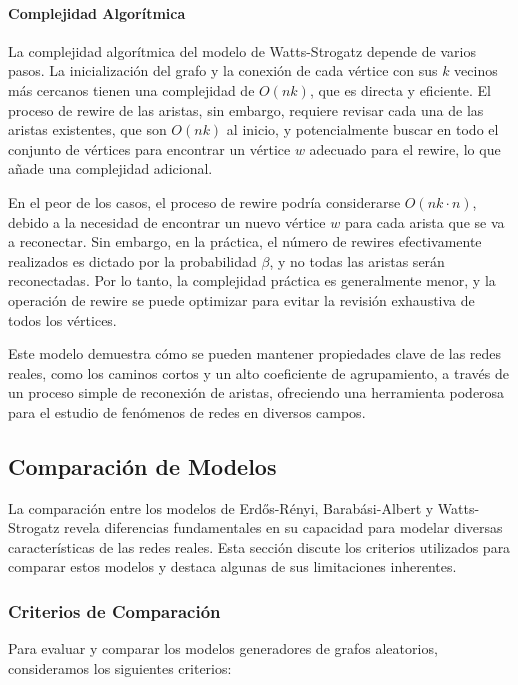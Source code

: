 \documentclass[12pt]{book}
\begin{document}
\paragraph{Complejidad Algorítmica}

La complejidad algorítmica del modelo de Watts-Strogatz depende de varios pasos. La inicialización del grafo y la conexión de cada vértice con sus $k$ vecinos más cercanos tienen una complejidad de $O(nk)$, que es directa y eficiente. El proceso de rewire de las aristas, sin embargo, requiere revisar cada una de las aristas existentes, que son $O(nk)$ al inicio, y potencialmente buscar en todo el conjunto de vértices para encontrar un vértice $w$ adecuado para el rewire, lo que añade una complejidad adicional.

En el peor de los casos, el proceso de rewire podría considerarse $O(nk \cdot n)$, debido a la necesidad de encontrar un nuevo vértice $w$ para cada arista que se va a reconectar. Sin embargo, en la práctica, el número de rewires efectivamente realizados es dictado por la probabilidad $\beta$, y no todas las aristas serán reconectadas. Por lo tanto, la complejidad práctica es generalmente menor, y la operación de rewire se puede optimizar para evitar la revisión exhaustiva de todos los vértices.

Este modelo demuestra cómo se pueden mantener propiedades clave de las redes reales, como los caminos cortos y un alto coeficiente de agrupamiento, a través de un proceso simple de reconexión de aristas, ofreciendo una herramienta poderosa para el estudio de fenómenos de redes en diversos campos.

\subsection{Comparación de Modelos}
La comparación entre los modelos de Erdős-Rényi, Barabási-Albert y Watts-Strogatz revela diferencias fundamentales en su capacidad para modelar diversas características de las redes reales. Esta sección discute los criterios utilizados para comparar estos modelos y destaca algunas de sus limitaciones inherentes.

\subsubsection{Criterios de Comparación}
Para evaluar y comparar los modelos generadores de grafos aleatorios, consideramos los siguientes criterios:
\end{document}
